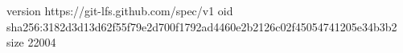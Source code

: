 version https://git-lfs.github.com/spec/v1
oid sha256:3182d3d13d62f55f79e2d700f1792ad4460e2b2126c02f45054741205e34b3b2
size 22004
